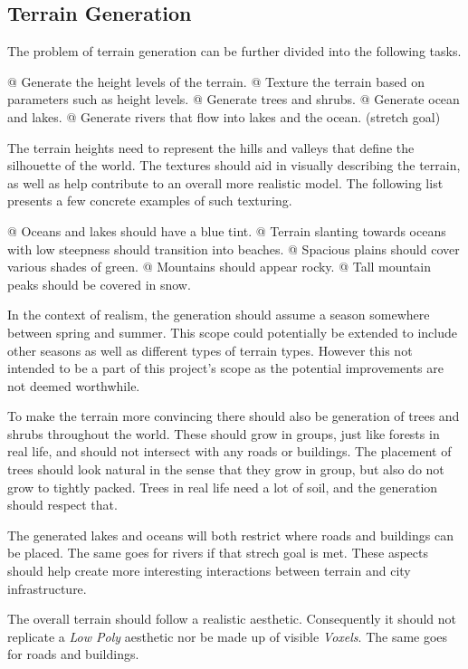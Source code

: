 \subsection{Terrain Generation}

The problem of terrain generation can be further divided into the following tasks.
\begin{easylist}
  @ Generate the height levels of the terrain.
  @ Texture the terrain based on parameters such as height levels.
  @ Generate trees and shrubs.
  @ Generate ocean and lakes.
  @ Generate rivers that flow into lakes and the ocean. (stretch goal)
\end{easylist}

The terrain heights need to represent the hills and valleys that define the silhouette of the world.
The textures should aid in visually describing the terrain, as well as help contribute to an overall more realistic model.
The following list presents a few concrete examples of such texturing.
\begin{easylist}
  @ Oceans and lakes should have a blue tint.
  @ Terrain slanting towards oceans with low steepness should transition into beaches.
  @ Spacious plains should cover various shades of green.
  @ Mountains should appear rocky.
  @ Tall mountain peaks should be covered in snow.
\end{easylist}

In the context of realism, the generation should assume a season somewhere between spring and summer.
This scope could potentially be extended to include other seasons as well as different types of terrain types.
However this not intended to be a part of this project's scope as the potential improvements are not deemed worthwhile.

To make the terrain more convincing there should also be generation of trees and shrubs throughout the world.
These should grow in groups, just like forests in real life, and should not intersect with any roads or buildings.
The placement of trees should look natural in the sense that they grow in group, but also do not grow to tightly packed.
Trees in real life need a lot of soil, and the generation should respect that.

The generated lakes and oceans will both restrict where roads and buildings can be placed.
The same goes for rivers if that strech goal is met.
These aspects should help create more interesting interactions between terrain and city infrastructure.

The overall terrain should follow a realistic aesthetic.
Consequently it should not replicate a \textit{Low Poly} aesthetic nor be made up of visible \textit{Voxels}.
The same goes for roads and buildings.